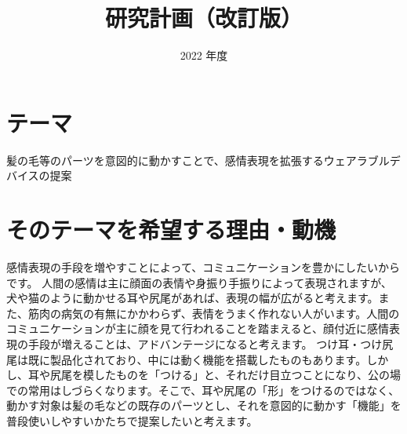 \documentclass[a4paper]{jsarticle}
\begin{document}
\masterthesis %


\title{研究計画（改訂版）}
\date{2022 年度}
\maketitle


\setcounter{page}{1} %



\newpage

\setcounter{page}{1} %

\section{テーマ}
髪の毛等のパーツを意図的に動かすことで、感情表現を拡張するウェアラブルデバイスの提案

\section{そのテーマを希望する理由・動機}
感情表現の手段を増やすことによって、コミュニケーションを豊かにしたいからです。
人間の感情は主に顔面の表情や身振り手振りによって表現されますが、犬や猫のように動かせる耳や尻尾があれば、表現の幅が広がると考えます。また、筋肉の病気の有無にかかわらず、表情をうまく作れない人がいます。人間のコミュニケーションが主に顔を見て行われることを踏まえると、顔付近に感情表現の手段が増えることは、アドバンテージになると考えます。
つけ耳・つけ尻尾は既に製品化されており、中には動く機能を搭載したものもあります。しかし、耳や尻尾を模したものを「つける」と、それだけ目立つことになり、公の場での常用はしづらくなります。そこで、耳や尻尾の「形」をつけるのではなく、動かす対象は髪の毛などの既存のパーツとし、それを意図的に動かす「機能」を普段使いしやすいかたちで提案したいと考えます。
\end{document}
